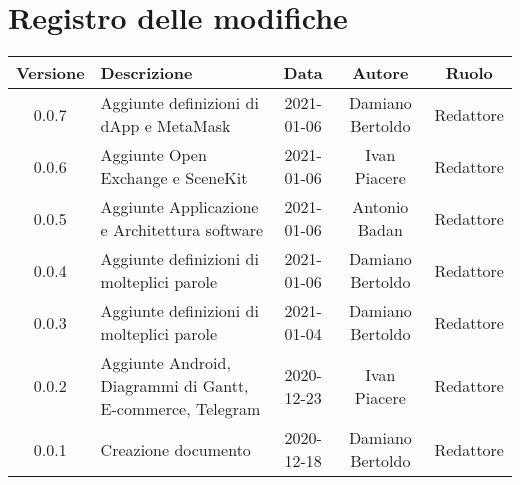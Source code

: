\section*{Registro delle modifiche}

\begin{center}
	\begin{longtable}{|c|p{5cm}|c|c|c|}
	\hline
	\rowcolor{lighter-grayer}
	\textbf{Versione} & \textbf{Descrizione} & \textbf{Data} & \textbf{Autore} & \textbf{Ruolo} \\
	\hline
	\endfirsthead

	0.0.7 & Aggiunte definizioni di dApp e MetaMask & 2021-01-06 & Damiano Bertoldo & Redattore \\
	\hline
	0.0.6 & Aggiunte Open Exchange e SceneKit & 2021-01-06 & Ivan Piacere & Redattore \\
	\hline
	0.0.5 & Aggiunte Applicazione e Architettura software & 2021-01-06 & Antonio Badan & Redattore \\
	\hline
	0.0.4 & Aggiunte definizioni di molteplici parole & 2021-01-06 & Damiano Bertoldo & Redattore \\
	\hline
	0.0.3 & Aggiunte definizioni di molteplici parole & 2021-01-04 & Damiano Bertoldo & Redattore \\
	\hline
	0.0.2 & Aggiunte Android, Diagrammi di Gantt, E-commerce, Telegram & 2020-12-23 & Ivan Piacere & Redattore \\
	\hline
	0.0.1 & Creazione documento & 2020-12-18 & Damiano Bertoldo & Redattore \\
	\hline

	\end{longtable}
\end{center}